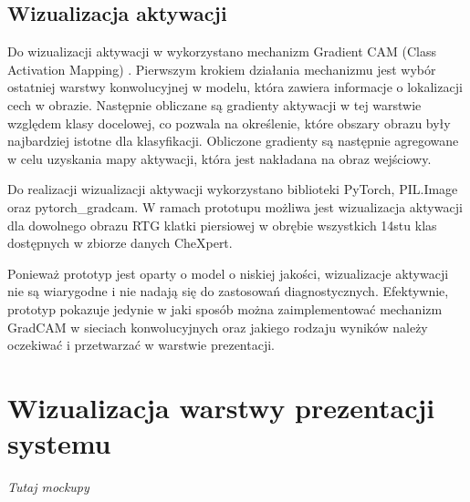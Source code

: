 \documentclass{article}
\begin{document}
\subsection{Wizualizacja aktywacji}

Do wizualizacji aktywacji w wykorzystano mechanizm Gradient CAM (Class Activation Mapping) \cite{selvaraju2017gradcam}.
Pierwszym krokiem działania mechanizmu jest wybór ostatniej warstwy konwolucyjnej w modelu, która zawiera informacje o lokalizacji cech w obrazie.
Następnie obliczane są gradienty aktywacji w tej warstwie względem klasy docelowej, co pozwala na określenie, które obszary obrazu były najbardziej istotne dla klasyfikacji.
Obliczone gradienty są następnie agregowane w celu uzyskania mapy aktywacji, która jest nakładana na obraz wejściowy.

Do realizacji wizualizacji aktywacji wykorzystano biblioteki PyTorch, PIL.Image oraz pytorch\_gradcam.
W ramach prototupu możliwa jest wizualizacja aktywacji dla dowolnego obrazu RTG klatki piersiowej w obrębie wszystkich 14stu klas dostępnych w zbiorze danych CheXpert.

Ponieważ prototyp jest oparty o model o niskiej jakości, wizualizacje aktywacji nie są wiarygodne i nie nadają się do zastosowań diagnostycznych.
Efektywnie, prototyp pokazuje jedynie w jaki sposób można zaimplementować mechanizm GradCAM w sieciach konwolucyjnych oraz jakiego rodzaju wyników należy oczekiwać i przetwarzać w warstwie prezentacji.

\section{Wizualizacja warstwy prezentacji systemu}
\textit{Tutaj mockupy}
\end{document}
